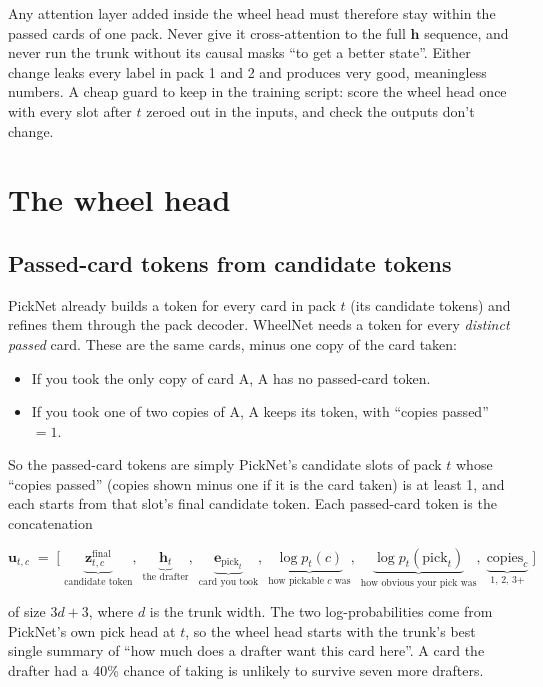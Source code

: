 \documentclass[11pt,letterpaper]{article}
\begin{document}
Any attention layer added inside the wheel head must therefore stay within the passed cards of one pack.
Never give it cross-attention to the full $\mathbf h$ sequence, and never run the trunk without its causal
masks ``to get a better state''. Either change leaks every label in pack 1 and 2 and produces very good,
meaningless numbers. A cheap guard to keep in the training script: score the wheel head once with every
slot after $t$ zeroed out in the inputs, and check the outputs don't change.

\section{The wheel head}\label{sec:head}

\subsection{Passed-card tokens from candidate tokens}

PickNet already builds a token for every card in pack $t$ (its candidate tokens) and refines them through
the pack decoder. WheelNet needs a token for every \emph{distinct passed} card. These are the same cards,
minus one copy of the card taken:

\begin{itemize}
\item If you took the only copy of card A, A has no passed-card token.
\item If you took one of two copies of A, A keeps its token, with ``copies passed'' $=1$.
\end{itemize}

So the passed-card tokens are simply PickNet's candidate slots of pack $t$ whose ``copies passed''
(copies shown minus one if it is the card taken) is at least 1, and each starts from that slot's final
candidate token. Each passed-card token is the concatenation

\[
\mathbf u_{t,c} \;=\; \big[\;\underbrace{\mathbf z^{\text{final}}_{t,c}}_{\text{candidate token}},\;
\underbrace{\mathbf h_t}_{\text{the drafter}},\;
\underbrace{\mathbf e_{\text{pick}_t}}_{\text{card you took}},\;
\underbrace{\log p_t(c)}_{\text{how pickable }c\text{ was}},\;
\underbrace{\log p_t(\text{pick}_t)}_{\text{how obvious your pick was}},\;
\underbrace{\text{copies}_c}_{\text{1, 2, 3+}}\;\big]
\]

\noindent of size $3d+3$, where $d$ is the trunk width. The two log-probabilities come from PickNet's own pick
head at $t$, so the wheel head starts with the trunk's best single summary of ``how much does a drafter want
this card here''. A card the drafter had a 40\% chance of taking is unlikely to survive seven more drafters.
\end{document}
